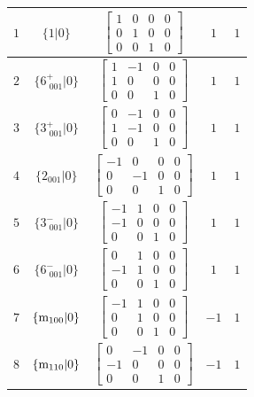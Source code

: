 \documentclass[fleqn,8pt]{jsarticle}
\begin{document}
\begin{longtable}{ccccc}
$ 1 $ & $ \{1|0\} $ & $ \begin{bmatrix} 1 & 0 & 0 & 0 \\ 0 & 1 & 0 & 0 \\ 0 & 0 & 1 & 0 \end{bmatrix} $ & $ 1 $ & $ 1 $ \\ \hline
$ 2 $ & $ \{6^{+}_{\,\,001}|0\} $ & $ \begin{bmatrix} 1 & -1 & 0 & 0 \\ 1 & 0 & 0 & 0 \\ 0 & 0 & 1 & 0 \end{bmatrix} $ & $ 1 $ & $ 1 $ \\ \hline
$ 3 $ & $ \{3^{+}_{\,\,001}|0\} $ & $ \begin{bmatrix} 0 & -1 & 0 & 0 \\ 1 & -1 & 0 & 0 \\ 0 & 0 & 1 & 0 \end{bmatrix} $ & $ 1 $ & $ 1 $ \\ \hline
$ 4 $ & $ \{2{}_{001}|0\} $ & $ \begin{bmatrix} -1 & 0 & 0 & 0 \\ 0 & -1 & 0 & 0 \\ 0 & 0 & 1 & 0 \end{bmatrix} $ & $ 1 $ & $ 1 $ \\ \hline
$ 5 $ & $ \{3^{-}_{\,\,001}|0\} $ & $ \begin{bmatrix} -1 & 1 & 0 & 0 \\ -1 & 0 & 0 & 0 \\ 0 & 0 & 1 & 0 \end{bmatrix} $ & $ 1 $ & $ 1 $ \\ \hline
$ 6 $ & $ \{6^{-}_{\,\,001}|0\} $ & $ \begin{bmatrix} 0 & 1 & 0 & 0 \\ -1 & 1 & 0 & 0 \\ 0 & 0 & 1 & 0 \end{bmatrix} $ & $ 1 $ & $ 1 $ \\ \hline
$ 7 $ & $ \{{\rm m}_{100}|0\} $ & $ \begin{bmatrix} -1 & 1 & 0 & 0 \\ 0 & 1 & 0 & 0 \\ 0 & 0 & 1 & 0 \end{bmatrix} $ & $ -1 $ & $ 1 $ \\ \hline
$ 8 $ & $ \{{\rm m}_{110}|0\} $ & $ \begin{bmatrix} 0 & -1 & 0 & 0 \\ -1 & 0 & 0 & 0 \\ 0 & 0 & 1 & 0 \end{bmatrix} $ & $ -1 $ & $ 1 $ \\ \hline

\end{longtable}
\end{document}
